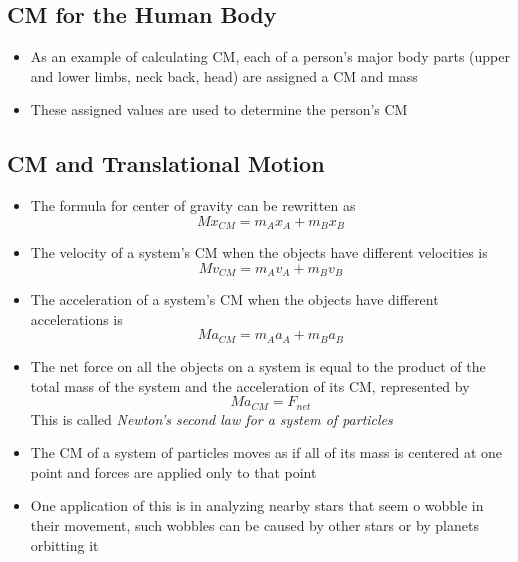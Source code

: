 \subsection{CM for the Human Body}
\begin{itemize}
    \item As an example of calculating CM, each of a person's major body parts (upper and lower limbs, neck back, head) are assigned a CM and mass
    \item These assigned values are used to determine the person's CM
\end{itemize}

\subsection{CM and Translational Motion}
\begin{itemize}
    \item The formula for center of gravity can be rewritten as \[Mx_{CM}=m_Ax_A+m_Bx_B\] 
    \item The velocity of a system's CM when the objects have different velocities is \[Mv_{CM}=m_Av_A+m_Bv_B\] 
    \item The acceleration of a system's CM when the objects have different accelerations is \[Ma_{CM}=m_Aa_A+m_Ba_B\]
    \item The net force on all the objects on a system is equal to the product of the total mass of the system and the acceleration of its CM, represented by \[Ma_{CM}=F_{net}\] This is called \emph{Newton's second law for a system of particles}
    \item The CM of a system of particles moves as if all of its mass is centered at one point and forces are applied only to that point
    \item One application of this is in analyzing nearby stars that seem o wobble in their movement, such wobbles can be caused by other stars or by planets orbitting it
\end{itemize}

\newpage